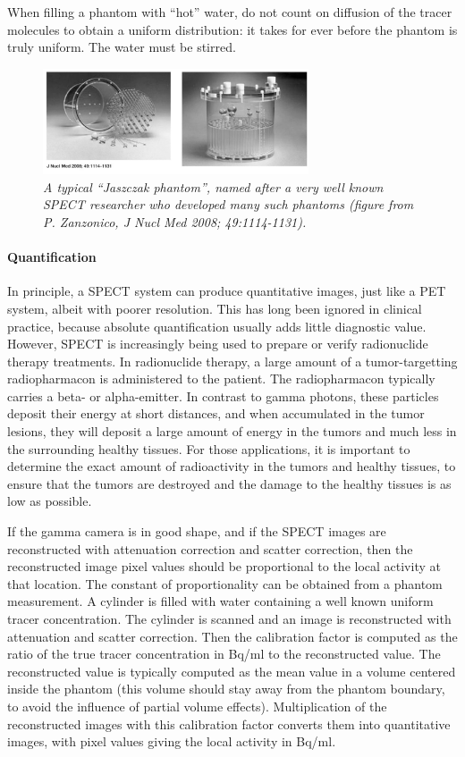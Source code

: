 \documentclass[11pt,oneside]{article}
\begin{document}
When filling a phantom with ``hot'' water, do not count on diffusion of the
tracer molecules to obtain a uniform distribution: it takes for ever before the
phantom is truly uniform. The water must be stirred.
\begin{figure}[tb]
\centering
\includegraphics[width=0.7\textwidth]{figs/fig_jaszczakphantom.pdf}
\caption{\label{fig:jaszczak} \emph{A typical ``Jaszczak phantom'',
    named after a very well known SPECT researcher who developed many
    such phantoms (figure from P. Zanzonico, {\em J Nucl Med} 2008;
    49:1114-1131).}}
\end{figure}

\paragraph{Quantification} \label{sec:spectquant}
In principle, a SPECT system can produce quantitative images, just
like a PET system, albeit with poorer resolution. This has long been
ignored in clinical practice, because absolute quantification usually
adds little diagnostic value. However, SPECT is increasingly being
used to prepare or verify radionuclide therapy treatments. In
radionuclide therapy, a large amount of a tumor-targetting
radiopharmacon is administered to the patient. The radiopharmacon
typically carries a beta- or alpha-emitter. In contrast to gamma
photons, these particles deposit their energy at short distances, and
when accumulated in the tumor lesions, they will deposit a large
amount of energy in the tumors and much less in the surrounding
healthy tissues. For those applications, it is important to determine
the exact amount of radioactivity in the tumors and healthy tissues,
to ensure that the tumors are destroyed and the damage to the healthy
tissues is as low as possible.

If the gamma camera is in good shape, and if the SPECT images are
reconstructed with attenuation correction and scatter correction, then
the reconstructed image pixel values should be proportional to the
local activity at that location. The constant of proportionality can
be obtained from a phantom measurement. A cylinder is filled with
water containing a well known uniform tracer concentration. The
cylinder is scanned and an image is reconstructed with attenuation and
scatter correction. Then the calibration factor is computed as the
ratio of the true tracer concentration in Bq/ml to the reconstructed
value. The reconstructed value is typically computed as the mean value
in a volume centered inside the phantom (this volume should stay away
from the phantom boundary, to avoid the influence of partial volume
effects). Multiplication of the reconstructed images with this
calibration factor converts them into quantitative images, with pixel
values giving the local activity in Bq/ml.
\end{document}
